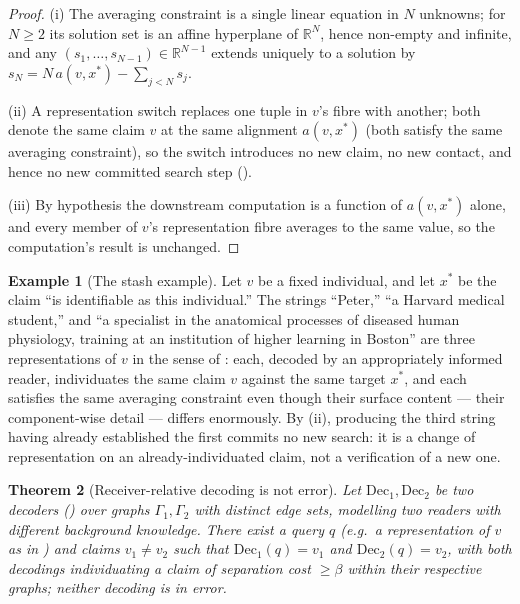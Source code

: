 \documentclass[11pt,twocolumn,a4paper]{article}
\theoremstyle{thmstyle}
\newtheorem{theorem}{Theorem}[section]
\theoremstyle{definition}
\newtheorem{example}[theorem]{Example}
\theoremstyle{remark}
\newcommand{\R}{\mathbb{R}}
\newcommand{\Gph}{\Gamma}
\newcommand{\flo}{\beta}
\begin{document}
\begin{proof}
(i) The averaging constraint is a single linear equation in $N$ unknowns;
for $N\ge2$ its solution set is an affine hyperplane of $\R^{N}$, hence
non-empty and infinite, and any $(s_1,\dots,s_{N-1})\in\R^{N-1}$ extends
uniquely to a solution by $s_N=N\,a(v,x^{\ast})-\sum_{j<N}s_j$.

(ii) A representation switch replaces one tuple in $v$'s fibre with
another; both denote the same claim $v$ at the same alignment
$a(v,x^{\ast})$ (both satisfy the same averaging constraint), so the switch
introduces no new claim, no new contact, and hence no new committed search
step ().

(iii) By hypothesis the downstream computation is a function of
$a(v,x^{\ast})$ alone, and every member of $v$'s representation fibre
averages to the same value, so the computation's result is unchanged.
\end{proof}

\begin{example}[The stash example]
\label{ex:stash}
Let $v$ be a fixed individual, and let $x^{\ast}$ be the claim ``is
identifiable as this individual.'' The strings ``Peter,'' ``a Harvard
medical student,'' and ``a specialist in the anatomical processes of
diseased human physiology, training at an institution of higher learning
in Boston'' are three representations of $v$ in the sense of
: each, decoded by an appropriately informed
reader, individuates the same claim $v$ against the same target
$x^{\ast}$, and each satisfies the same averaging constraint even though
their surface content --- their component-wise detail --- differs
enormously. By (ii), producing the third string
having already established the first commits no new search: it is a
change of representation on an already-individuated claim, not a
verification of a new one.
\end{example}

\begin{theorem}[Receiver-relative decoding is not error]
\label{thm:receiver-relative}
Let $\mathrm{Dec}_1,\mathrm{Dec}_2$ be two decoders ()
over graphs $\Gph_1,\Gph_2$ with distinct edge sets, modelling two readers
with different background knowledge. There exist a query $q$ (e.g.\ a
representation of $v$ as in ) and claims $v_1\neq v_2$ such
that $\mathrm{Dec}_1(q)=v_1$ and $\mathrm{Dec}_2(q)=v_2$, with both
decodings individuating a claim of separation cost $\ge\flo$ within their
respective graphs; neither decoding is in error.
\end{theorem}
\end{document}
